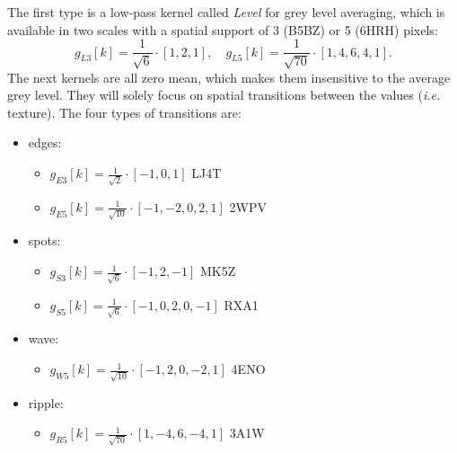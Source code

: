 \documentclass[fleqn,a4paper,oneside,openany]{book}
\newcommand\textid[1]{{\normalsize{\idfont #1}}}
\begin{document}
The first type is a low-pass kernel called \emph{Level} for grey level averaging, which is available in two scales with a spatial support of 3 (\textid{B5BZ}) or 5 (\textid{6HRH}) pixels:
$$g_{L3}[k] = \frac{1}{\sqrt{6}}\cdot\left[ 1,2,1 \right],\quad g_{L5}[k] = \frac{1}{\sqrt{70}}\cdot\left[ 1,4,6,4,1 \right].$$
The next kernels are all zero mean, which makes them insensitive to the average grey level. They will solely focus on spatial transitions between the values (\textit{i.e.} texture). The four types of transitions are:
\begin{itemize}
    \item edges:
    \begin{itemize}
        \item \(g_{E3}[k] = \frac{1}{\sqrt{2}}\cdot\left[-1, 0, 1 \right]\) \hfill \textid{LJ4T}
        \item \(g_{E5}[k] = \frac{1}{\sqrt{10}}\cdot\left[-1, -2, 0, 2, 1 \right]\) \hfill \textid{2WPV}
    \end{itemize}
    \item spots:
    \begin{itemize}
        \item \(g_{S3}[k] = \frac{1}{\sqrt{6}}\cdot\left[-1, 2, -1 \right]\) \hfill \textid{MK5Z}
        \item \(g_{S5}[k] = \frac{1}{\sqrt{6}}\cdot\left[-1, 0, 2, 0, -1 \right]\) \hfill \textid{RXA1}
    \end{itemize}
    \item wave:
    \begin{itemize}
        \item \(g_{W5}[k] = \frac{1}{\sqrt{10}}\cdot\left[-1, 2, 0, -2, 1 \right]\) \hfill \textid{4ENO}
    \end{itemize}
    \item ripple:
    \begin{itemize}
        \item \(g_{R5}[k] = \frac{1}{\sqrt{70}}\cdot\left[ 1, -4, 6, -4, 1 \right]\) \hfill \textid{3A1W}
    \end{itemize}
\end{itemize}
\end{document}

